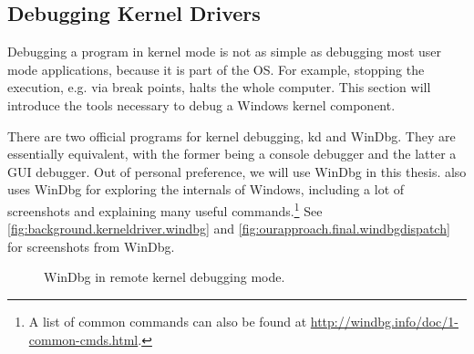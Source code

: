 \subsection{Debugging Kernel Drivers}
\label{chap:background.kerneldriver.debugging}
Debugging a program in kernel mode is not as simple as debugging most user mode applications, because it is part of the OS. For example, stopping the execution, e.g. via break points, halts the whole computer. This section will introduce the tools necessary to debug a Windows kernel component.

There are two official programs for kernel debugging, kd and WinDbg. They are essentially equivalent, with the former being a console debugger and the latter a GUI debugger. Out of personal preference, we will use WinDbg in this thesis. \cite{Yosifovich2017} also uses WinDbg for exploring the internals of Windows, including a lot of screenshots and explaining many useful commands.\footnote{\label{fn:background.kerneldriver.windbg} A list of common commands can also be found at \url{http://windbg.info/doc/1-common-cmds.html}.} See \autoref{fig:background.kerneldriver.windbg} and \autoref{fig:ourapproach.final.windbgdispatch} for screenshots from WinDbg.

\begin{figure}[htb!]
	\center
	\caption[
		WinDbg in remote kernel debugging mode
	]{
		WinDbg in remote kernel debugging mode. 
	}
	\label{fig:background.kerneldriver.windbg}
\end{figure}

